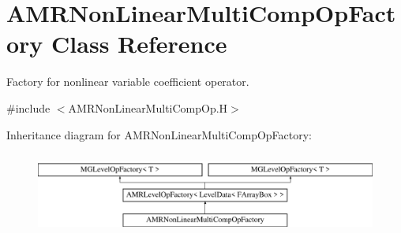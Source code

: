 \hypertarget{class_a_m_r_non_linear_multi_comp_op_factory}{}\section{A\+M\+R\+Non\+Linear\+Multi\+Comp\+Op\+Factory Class Reference}
\label{class_a_m_r_non_linear_multi_comp_op_factory}


Factory for nonlinear variable coefficient operator.  




{\ttfamily \#include $<$A\+M\+R\+Non\+Linear\+Multi\+Comp\+Op.\+H$>$}

Inheritance diagram for A\+M\+R\+Non\+Linear\+Multi\+Comp\+Op\+Factory\+:\begin{figure}[H]
\begin{center}
\leavevmode
\includegraphics[height=2.736156cm]{class_a_m_r_non_linear_multi_comp_op_factory}
\end{center}
\end{figure}
